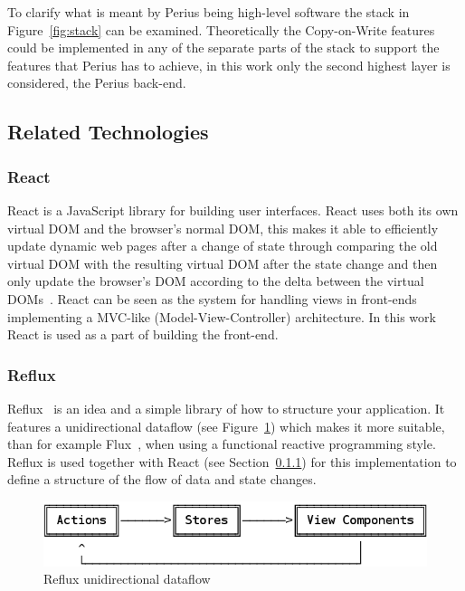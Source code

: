 \documentclass[a4paper,12pt]{article}
\begin{document}
To clarify what is meant by Perius being high-level software the stack in Figure~\ref{fig:stack} can
be examined. Theoretically the Copy-on-Write features could be implemented in any of the separate
parts of the stack to support the features that Perius has to achieve, in this work only the second
highest layer is considered, the Perius back-end.

\subsection{Related Technologies}
\subsubsection{React} \label{sec:react}
React is a JavaScript library for building user interfaces. React uses both its own virtual DOM and
the browser's normal DOM, this makes it able to efficiently update dynamic web pages after a change
of state through comparing the old virtual DOM with the resulting virtual DOM after the state change
and then only update the browser's DOM according to the delta between the virtual DOMs~\cite{REACT}.
React can be seen as the system for handling views in front-ends implementing a MVC-like
(Model-View-Controller) architecture. In this work React is used as a part of building the
front-end.

\subsubsection{Reflux} \label{sec:reflux}
Reflux~\cite{REFLUX} is an idea and a simple library of how to structure your application. It
features a unidirectional dataflow (see Figure~\ref{fig:reflux}) which makes it more suitable, than
for example Flux~\cite{FLUX}, when using a functional reactive programming style. Reflux is used
together with React (see Section~\ref{sec:react}) for this implementation to define a structure of
the flow of data and state changes.

\begin{figure}[H] 
    \centering
    \includegraphics[scale=0.4]{reflux.png}
    \caption{Reflux unidirectional dataflow}
    \label{fig:reflux}
\end{figure}
\end{document}
